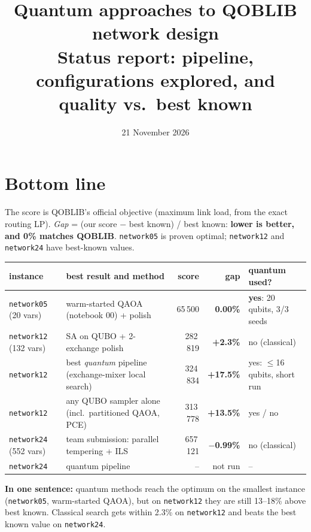 \documentclass[11pt]{article}
\title{\textbf{Quantum approaches to QOBLIB network design}\\[2pt]
\large Status report: pipeline, configurations explored, and quality vs.\ best known}
\date{21 November 2026}
\author{}
\newcommand{\gapgood}[1]{\textcolor{good}{\textbf{#1}}}
\newcommand{\gapmid}[1]{\textcolor{mid}{\textbf{#1}}}
\newcommand{\gapbad}[1]{\textcolor{bad}{\textbf{#1}}}
\begin{document}
\sloppy
\maketitle
\vspace{-1cm}

\section*{Bottom line}
The score is QOBLIB's official objective (maximum link load, from the exact routing LP).
\emph{Gap} = (our score $-$ best known) / best known: \textbf{lower is better, and 0\% matches
QOBLIB}. \texttt{network05} is proven optimal; \texttt{network12} and \texttt{network24} have best-known values.

\begin{center}
\renewcommand{\arraystretch}{1.25}\small
\begin{tabularx}{\textwidth}{@{}>{\raggedright\arraybackslash}p{24mm}Lrr>{\raggedright\arraybackslash}p{30mm}@{}}
\toprule
instance & best result and method & score & gap & quantum used?\\
\midrule
\texttt{network05} (20 vars) & warm-started QAOA (notebook 00) + polish & 65\,500 & \gapgood{0.00\%} & \textbf{yes}: 20 qubits, 3/3 seeds\\
\texttt{network12} (132 vars) & SA on QUBO + 2-exchange polish & 282\,819 & \gapmid{+2.3\%} & no (classical)\\
\texttt{network12} & best \emph{quantum} pipeline (exchange-mixer local search) & 324\,834 & \gapbad{+17.5\%} & yes: $\le$16 qubits, short run\\
\texttt{network12} & any QUBO sampler alone (incl.\ partitioned QAOA, PCE) & 313\,778 & \gapbad{+13.5\%} & yes / no\\
\texttt{network24} (552 vars) & team submission: parallel tempering + ILS & 657\,121 & \gapgood{$-$0.99\%} & no (classical)\\
\texttt{network24} & quantum pipeline & -- & not run & --\\
\bottomrule
\end{tabularx}
\end{center}

\noindent\textbf{In one sentence:} quantum methods reach the optimum on the smallest instance
(\texttt{network05}, warm-started QAOA), but on \texttt{network12} they are still
13--18\% above best known. Classical search gets within 2.3\% on \texttt{network12} and
beats the best known value on \texttt{network24}.
\end{document}
